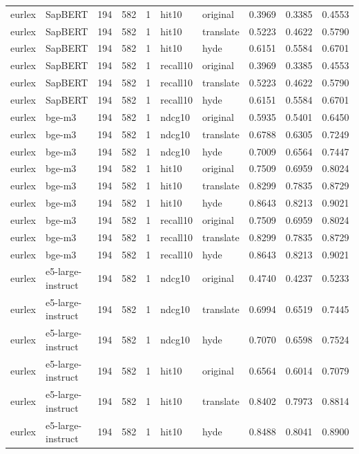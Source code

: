 \begin{tabular}{llrrrllrrr}
eurlex & SapBERT & 194 & 582 & 1 & hit10 & original & 0.3969 & 0.3385 & 0.4553 \\
eurlex & SapBERT & 194 & 582 & 1 & hit10 & translate & 0.5223 & 0.4622 & 0.5790 \\
eurlex & SapBERT & 194 & 582 & 1 & hit10 & hyde & 0.6151 & 0.5584 & 0.6701 \\
eurlex & SapBERT & 194 & 582 & 1 & recall10 & original & 0.3969 & 0.3385 & 0.4553 \\
eurlex & SapBERT & 194 & 582 & 1 & recall10 & translate & 0.5223 & 0.4622 & 0.5790 \\
eurlex & SapBERT & 194 & 582 & 1 & recall10 & hyde & 0.6151 & 0.5584 & 0.6701 \\
eurlex & bge-m3 & 194 & 582 & 1 & ndcg10 & original & 0.5935 & 0.5401 & 0.6450 \\
eurlex & bge-m3 & 194 & 582 & 1 & ndcg10 & translate & 0.6788 & 0.6305 & 0.7249 \\
eurlex & bge-m3 & 194 & 582 & 1 & ndcg10 & hyde & 0.7009 & 0.6564 & 0.7447 \\
eurlex & bge-m3 & 194 & 582 & 1 & hit10 & original & 0.7509 & 0.6959 & 0.8024 \\
eurlex & bge-m3 & 194 & 582 & 1 & hit10 & translate & 0.8299 & 0.7835 & 0.8729 \\
eurlex & bge-m3 & 194 & 582 & 1 & hit10 & hyde & 0.8643 & 0.8213 & 0.9021 \\
eurlex & bge-m3 & 194 & 582 & 1 & recall10 & original & 0.7509 & 0.6959 & 0.8024 \\
eurlex & bge-m3 & 194 & 582 & 1 & recall10 & translate & 0.8299 & 0.7835 & 0.8729 \\
eurlex & bge-m3 & 194 & 582 & 1 & recall10 & hyde & 0.8643 & 0.8213 & 0.9021 \\
eurlex & e5-large-instruct & 194 & 582 & 1 & ndcg10 & original & 0.4740 & 0.4237 & 0.5233 \\
eurlex & e5-large-instruct & 194 & 582 & 1 & ndcg10 & translate & 0.6994 & 0.6519 & 0.7445 \\
eurlex & e5-large-instruct & 194 & 582 & 1 & ndcg10 & hyde & 0.7070 & 0.6598 & 0.7524 \\
eurlex & e5-large-instruct & 194 & 582 & 1 & hit10 & original & 0.6564 & 0.6014 & 0.7079 \\
eurlex & e5-large-instruct & 194 & 582 & 1 & hit10 & translate & 0.8402 & 0.7973 & 0.8814 \\
eurlex & e5-large-instruct & 194 & 582 & 1 & hit10 & hyde & 0.8488 & 0.8041 & 0.8900 \\

\end{tabular}
